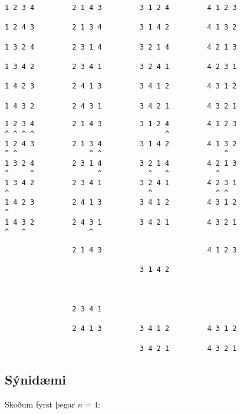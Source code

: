 { \begin{verbatim}
1 2 3 4         2 1 4 3         3 1 2 4         4 1 2 3

1 2 4 3         2 1 3 4         3 1 4 2         4 1 3 2

1 3 2 4         2 3 1 4         3 2 1 4         4 2 1 3

1 3 4 2         2 3 4 1         3 2 4 1         4 2 3 1

1 4 2 3         2 4 1 3         3 4 1 2         4 3 1 2

1 4 3 2         2 4 3 1         3 4 2 1         4 3 2 1

\end{verbatim}}
{ \begin{verbatim}
1 2 3 4         2 1 4 3         3 1 2 4         4 1 2 3
^ ^ ^ ^                               ^                
1 2 4 3         2 1 3 4         3 1 4 2         4 1 3 2
^ ^                 ^ ^                             ^  
1 3 2 4         2 3 1 4         3 2 1 4         4 2 1 3
^     ^               ^           ^   ^           ^    
1 3 4 2         2 3 4 1         3 2 4 1         4 2 3 1
^                                 ^               ^ ^  
1 4 2 3         2 4 1 3         3 4 1 2         4 3 1 2
^                                                      
1 4 3 2         2 4 3 1         3 4 2 1         4 3 2 1
^   ^               ^                                  
\end{verbatim}}
{ \begin{verbatim}
                2 1 4 3                         4 1 2 3

                                3 1 4 2                



                2 3 4 1                                

                2 4 1 3         3 4 1 2         4 3 1 2

                                3 4 2 1         4 3 2 1

\end{verbatim}}
\subsection{Sýnidæmi}
{
    {
        \item<1-> Skoðum fyrst þegar $n = 4$:
    }
}

